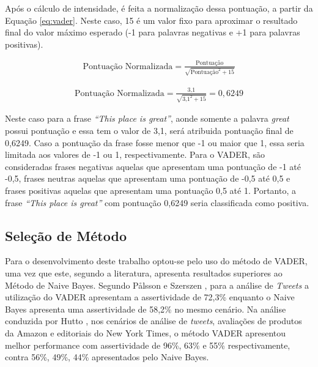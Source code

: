 Após o cálculo de intensidade, é feita a normalização dessa
pontuação, a partir da Equação \ref{eq:vader}. Neste caso, 15 é um valor
fixo para aproximar o resultado final do valor máximo esperado (-1 para
palavras negativas e +1 para palavras positivas).

\begin{equation}
\begin{gathered}
\text{Pontuação Normalizada}
=
\frac{\text{Pontuação}}{\sqrt{\text{Pontuação}^2 + 15}}
\label{eq:vader}
\end{gathered}
\end{equation}


\begin{equation}
\begin{gathered}
\text{Pontuação Normalizada}
=
\frac{\text{3,1}}{\sqrt{\text{3,1}^2 + 15}} = 0,6249
\label{eq:vaderscore}
\end{gathered}
\end{equation}

Neste caso para a frase \textit{``This place is great''}, aonde somente a
palavra \textit{great} possui pontuação e essa tem o valor de 3,1, será
atribuida pontuação final de 0,6249.  Caso a
pontuação da frase fosse menor que -1 ou maior que 1, essa seria limitada aos
valores de -1 ou 1, respectivamente. Para o \ac{VADER}, são consideradas frases negativas
aquelas que apresentam uma pontuação de -1 até -0,5, frases neutras aquelas que
apresentam uma pontuação de -0,5 até 0,5 e frases positivas aquelas que
apresentam uma pontuação 0,5 até 1.
Portanto, a frase \textit{``This place is great''} com pontuação 0,6249 seria
classificada como positiva.

\subsection{Seleção de Método}

Para o desenvolvimento deste trabalho optou-se pelo uso do método de \ac{VADER},
uma vez que este, segundo a literatura, apresenta resultados superiores ao
Método de Naive Bayes. Segundo Pålsson e Szerszen \cite{SentimentinSocialMedia}, para a análise de \textit{Tweets} a
utilização do \ac{VADER} apresentam a assertividade de 72,3\% enquanto o Naive
Bayes apresenta uma assertividade de 58,2\% no mesmo cenário.
Na análise conduzida por Hutto \cite{conf/icwsm/HuttoG14}, nos cenários de
análise de \textit{tweets}, avaliações de produtos da Amazon e editoriais do New
York Times, o método \ac{VADER} apresentou melhor performance com assertividade
de 96\%, 63\% e 55\% respectivamente, contra 56\%, 49\%, 44\% apresentados pelo Naive Bayes.

